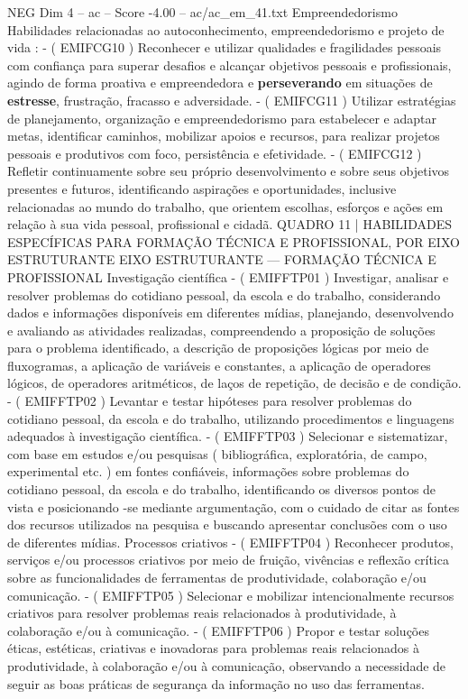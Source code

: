 \begin{textsample}{NEG Dim 4 – ac – Score -4.00 – ac/ac\_em\_41.txt}
Empreendedorismo Habilidades relacionadas ao autoconhecimento, empreendedorismo e projeto de vida : - ( EMIFCG10 ) Reconhecer e utilizar qualidades e fragilidades pessoais com confiança para superar desafios e alcançar objetivos pessoais e profissionais, agindo de forma proativa e empreendedora e \textbf{perseverando} em situações de \textbf{estresse}, frustração, fracasso e adversidade. - ( EMIFCG11 ) Utilizar estratégias de planejamento, organização e empreendedorismo para estabelecer e adaptar metas, identificar caminhos, mobilizar apoios e recursos, para realizar projetos pessoais e produtivos com foco, persistência e efetividade. - ( EMIFCG12 ) Refletir continuamente sobre seu próprio desenvolvimento e sobre seus objetivos presentes e futuros, identificando aspirações e oportunidades, inclusive relacionadas ao mundo do trabalho, que orientem escolhas, esforços e ações em relação à sua vida pessoal, profissional e cidadã.
QUADRO 11 | HABILIDADES ESPECÍFICAS PARA FORMAÇÃO TÉCNICA E PROFISSIONAL, POR EIXO ESTRUTURANTE EIXO ESTRUTURANTE — FORMAÇÃO TÉCNICA E PROFISSIONAL Investigação científica - ( EMIFFTP01 ) Investigar, analisar e resolver problemas do cotidiano pessoal, da escola e do trabalho, considerando dados e informações disponíveis em diferentes mídias, planejando, desenvolvendo e avaliando as atividades realizadas, compreendendo a proposição de soluções para o problema identificado, a descrição de proposições lógicas por meio de fluxogramas, a aplicação de variáveis e constantes, a aplicação de operadores lógicos, de operadores aritméticos, de laços de repetição, de decisão e de condição. - ( EMIFFTP02 ) Levantar e testar hipóteses para resolver problemas do cotidiano pessoal, da escola e do trabalho, utilizando procedimentos e linguagens adequados à investigação científica. - ( EMIFFTP03 ) Selecionar e sistematizar, com base em estudos e/ou pesquisas ( bibliográfica, exploratória, de campo, experimental etc. ) em fontes confiáveis, informações sobre problemas do cotidiano pessoal, da escola e do trabalho, identificando os diversos pontos de vista e posicionando -se mediante argumentação, com o cuidado de citar as fontes dos recursos utilizados na pesquisa e buscando apresentar conclusões com o uso de diferentes mídias.
Processos criativos - ( EMIFFTP04 ) Reconhecer produtos, serviços e/ou processos criativos por meio de fruição, vivências e reflexão crítica sobre as funcionalidades de ferramentas de produtividade, colaboração e/ou comunicação. - ( EMIFFTP05 ) Selecionar e mobilizar intencionalmente recursos criativos para resolver problemas reais relacionados à produtividade, à colaboração e/ou à comunicação. - ( EMIFFTP06 ) Propor e testar soluções éticas, estéticas, criativas e inovadoras para problemas reais relacionados à produtividade, à colaboração e/ou à comunicação, observando a necessidade de seguir as boas práticas de segurança da informação no uso das ferramentas.

\end{textsample}
